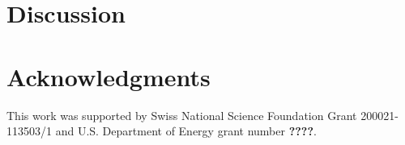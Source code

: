 \documentclass[3p]{elsarticle}
\begin{document}
\section{Discussion}

\nonumber\section{Acknowledgments} This work was supported by Swiss National Science Foundation
Grant 200021-113503/1 and U.S. Department of Energy grant number {\bf ????}.



\end{document}
